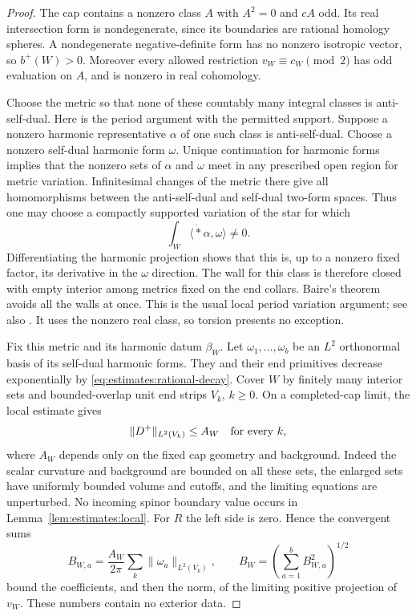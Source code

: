 \begin{proof}
The cap contains a nonzero class $A$ with $A^2=0$ and $cA$ odd.
Its real intersection form is nondegenerate, since its boundaries
are rational homology spheres.  A nondegenerate negative-definite
form has no nonzero isotropic vector, so $b^+(W)>0$.
Moreover every allowed restriction $v_W\equiv c_W\pmod2$ has odd
evaluation on $A$, and is nonzero in real cohomology.

Choose the metric so that none of these countably many integral
classes is anti-self-dual.  Here is the period argument with the
permitted support.  Suppose a nonzero harmonic representative
$\alpha$ of one such class is anti-self-dual.  Choose a nonzero
self-dual harmonic form $\omega$.  Unique continuation for harmonic
forms~\cite[Remark~3]{Aronszajn1957} implies
that the nonzero sets of $\alpha$ and $\omega$ meet in any prescribed
open region for metric variation.  Infinitesimal changes of the
metric there give all homomorphisms between the anti-self-dual and
self-dual two-form spaces.  Thus one may choose a compactly
supported variation of the star for which
\[
                       \int_W\langle\dot *\alpha,\omega\rangle\ne0.
\]
Differentiating the harmonic projection shows that this is, up to
a nonzero fixed factor, its derivative in the $\omega$ direction.
The wall for this class is therefore closed with empty interior
among metrics fixed on the end collars.  Baire's theorem avoids
all the walls at once.  This is the usual local period variation
argument; see also \cite{DonaldsonKronheimer1990}.  It uses the
nonzero real class, so torsion presents no exception.

Fix this metric and its harmonic datum $\beta_W$.  Let
$\omega_1,\ldots,\omega_b$ be an $L^2$ orthonormal basis of its
self-dual harmonic forms.  They and their end primitives decrease
exponentially by \eqref{eq:estimates:rational-decay}.  Cover $W$ by
finitely many interior sets and bounded-overlap unit end strips
$V_k$, $k\geq0$.  On a completed-cap limit, the local estimate gives
\begin{equation}
                 \|D^+\|_{L^2(V_k)}\leq A_W
                 \quad\hbox{for every }k,
                 \label{eq:estimates:cap-local}
\end{equation}
where $A_W$ depends only on the fixed cap geometry and background.
Indeed the scalar curvature and background are bounded on all
these sets, the enlarged sets have uniformly bounded volume and
cutoffs, and the limiting equations are unperturbed.  No incoming
spinor boundary value occurs in Lemma~\ref{lem:estimates:local}.
For $R$ the left side is zero.  Hence the convergent sums
\begin{equation}
 B_{W,a}=\frac{A_W}{2\pi}\sum_k\|\omega_a\|_{L^2(V_k)},
 \qquad
 B_W=\left(\sum_{a=1}^bB_{W,a}^2\right)^{1/2}
 \label{eq:estimates:cap-constant}
\end{equation}
bound the coefficients, and then the norm, of the limiting positive
projection of $v_W$.  These numbers contain no exterior data.


\end{proof}

